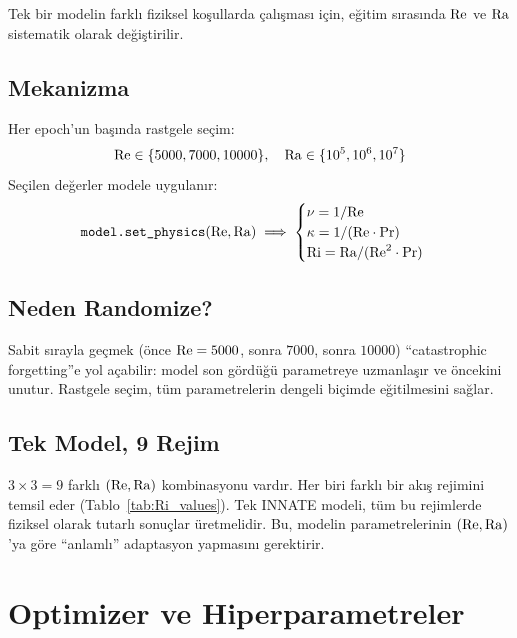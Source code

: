 Tek bir modelin farklı fiziksel koşullarda çalışması için, eğitim sırasında $\mathrm{Re}$ ve $\mathrm{Ra}$ sistematik olarak değiştirilir.

\subsection{Mekanizma}

Her epoch'un başında rastgele seçim:
\begin{equation}
    \mathrm{Re} \in \{5000, 7000, 10000\}, \quad \mathrm{Ra} \in \{10^5, 10^6, 10^7\}
    \label{eq:sweep_values}
\end{equation}
Seçilen değerler modele uygulanır:
\begin{equation}
    \texttt{model.set\_physics}(\mathrm{Re}, \mathrm{Ra}) \implies
    \begin{cases}
        \nu = 1/\mathrm{Re} \\
        \kappa = 1/(\mathrm{Re} \cdot \mathrm{Pr}) \\
        \mathrm{Ri} = \mathrm{Ra} / (\mathrm{Re}^2 \cdot \mathrm{Pr})
    \end{cases}
    \label{eq:set_physics}
\end{equation}

\subsection{Neden Randomize?}

Sabit sırayla geçmek (\"once $\mathrm{Re} = 5000$, sonra $7000$, sonra $10000$) ``catastrophic forgetting''e yol açabilir: model son gördüğü parametreye uzmanlaşır ve öncekini unutur. Rastgele seçim, tüm parametrelerin dengeli biçimde eğitilmesini sağlar.

\subsection{Tek Model, 9 Rejim}

$3 \times 3 = 9$ farklı $(\mathrm{Re}, \mathrm{Ra})$ kombinasyonu vardır. Her biri farklı bir akış rejimini temsil eder (Tablo~\ref{tab:Ri_values}). Tek INNATE modeli, tüm bu rejimlerde fiziksel olarak tutarlı sonuçlar üretmelidir. Bu, modelin parametrelerinin $(\mathrm{Re}, \mathrm{Ra})$'ya göre ``anlamlı'' adaptasyon yapmasını gerektirir.


\section{Optimizer ve Hiperparametreler}
\label{sec:optimizer}

